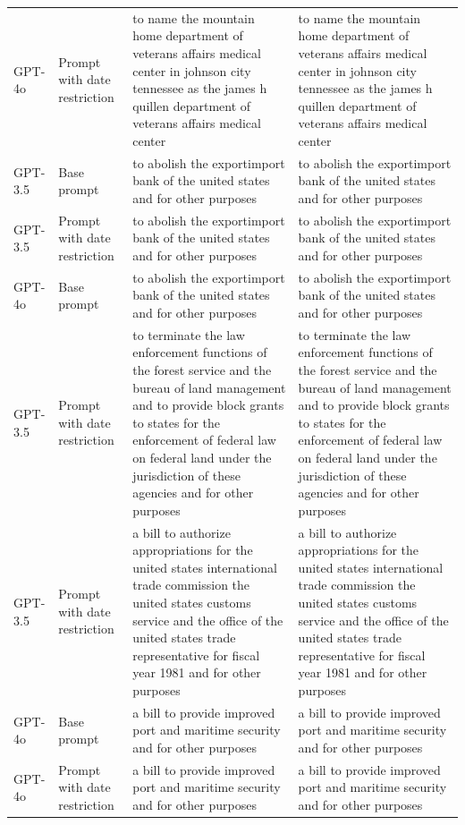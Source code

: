 \begin{longtable}{>{\raggedright\arraybackslash}p{1.4cm}>{\raggedright\arraybackslash}p{1.4cm}>{\raggedright\arraybackslash}p{5.5cm}>{\raggedright\arraybackslash}p{5.5cm}}
GPT-4o & Prompt with date restriction & to name the mountain home department of veterans affairs medical center in johnson city tennessee as the james h quillen department of veterans affairs medical center & to name the mountain home department of veterans affairs medical center in johnson city tennessee as the james h quillen department of veterans affairs medical center\\
GPT-3.5 & Base prompt & to abolish the exportimport bank of the united states and for other purposes & to abolish the exportimport bank of the united states and for other purposes\\
GPT-3.5 & Prompt with date restriction & to abolish the exportimport bank of the united states and for other purposes & to abolish the exportimport bank of the united states and for other purposes\\
GPT-4o & Base prompt & to abolish the exportimport bank of the united states and for other purposes & to abolish the exportimport bank of the united states and for other purposes\\
GPT-3.5 & Prompt with date restriction & to terminate the law enforcement functions of the forest service and the bureau of land management and to provide block grants to states for the enforcement of federal law on federal land under the jurisdiction of these agencies and for other purposes & to terminate the law enforcement functions of the forest service and the bureau of land management and to provide block grants to states for the enforcement of federal law on federal land under the jurisdiction of these agencies and for other purposes\\
GPT-3.5 & Prompt with date restriction & a bill to authorize appropriations for the united states international trade commission the united states customs service and the office of the united states trade representative for fiscal year 1981 and for other purposes & a bill to authorize appropriations for the united states international trade commission the united states customs service and the office of the united states trade representative for fiscal year 1981 and for other purposes\\
GPT-4o & Base prompt & a bill to provide improved port and maritime security and for other purposes & a bill to provide improved port and maritime security and for other purposes\\
GPT-4o & Prompt with date restriction & a bill to provide improved port and maritime security and for other purposes & a bill to provide improved port and maritime security and for other purposes\\

\end{longtable}
